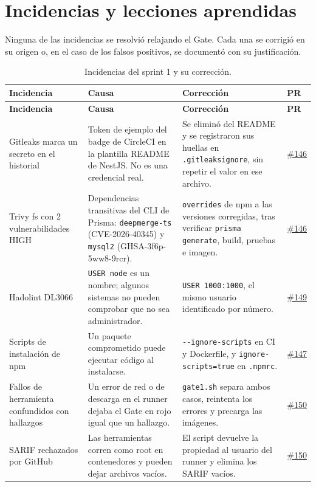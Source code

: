 \documentclass[11pt,a4paper]{report}
\newcommand{\pr}[1]{\href{https://github.com/PracticasESPE/Framework_Desarrollo_Seguro/pull/#1}{\##1}}
\begin{document}
\chapter{Incidencias y lecciones aprendidas}

Ninguna de las incidencias se resolvió relajando el Gate. Cada una se corrigió en su origen o,
en el caso de los falsos positivos, se documentó con su justificación.

{\small
\begin{longtable}{@{}P{3.3cm}P{4.5cm}P{5.0cm}P{1.2cm}@{}}
\caption{Incidencias del sprint 1 y su corrección.}\\
\toprule
\textbf{Incidencia} & \textbf{Causa} & \textbf{Corrección} & \textbf{PR}\\
\midrule
\endfirsthead
\toprule
\textbf{Incidencia} & \textbf{Causa} & \textbf{Corrección} & \textbf{PR}\\
\midrule
\endhead
Gitleaks marca un secreto en el historial & Token de ejemplo del badge de CircleCI en la plantilla README de NestJS. No es una credencial real. & Se eliminó del README y se registraron sus huellas en \texttt{.gitleaksignore}, sin repetir el valor en ese archivo. & \pr{146}\\
Trivy fs con 2 vulnerabilidades HIGH & Dependencias transitivas del CLI de Prisma: \texttt{deepmerge-ts} (CVE-2026-40345) y \texttt{mysql2} (GHSA-3f6p-5ww8-9rcr). & \texttt{overrides} de npm a las versiones corregidas, tras verificar \texttt{prisma generate}, build, pruebas e imagen. & \pr{146}\\
Hadolint DL3066 & \texttt{USER node} es un nombre; algunos sistemas no pueden comprobar que no sea administrador. & \texttt{USER 1000:1000}, el mismo usuario identificado por número. & \pr{149}\\
Scripts de instalación de npm & Un paquete comprometido puede ejecutar código al instalarse. & \texttt{-{}-ignore-scripts} en CI y Dockerfile, y \texttt{ignore-scripts=true} en \texttt{.npmrc}. & \pr{147}\\
Fallos de herramienta confundidos con hallazgos & Un error de red o de descarga en el runner dejaba el Gate en rojo igual que un hallazgo. & \texttt{gate1.sh} separa ambos casos, reintenta los errores y precarga las imágenes. & \pr{150}\\
SARIF rechazados por GitHub & Las herramientas corren como root en contenedores y pueden dejar archivos vacíos. & El script devuelve la propiedad al usuario del runner y elimina los SARIF vacíos. & \pr{150}\\

\end{longtable}}
\end{document}
